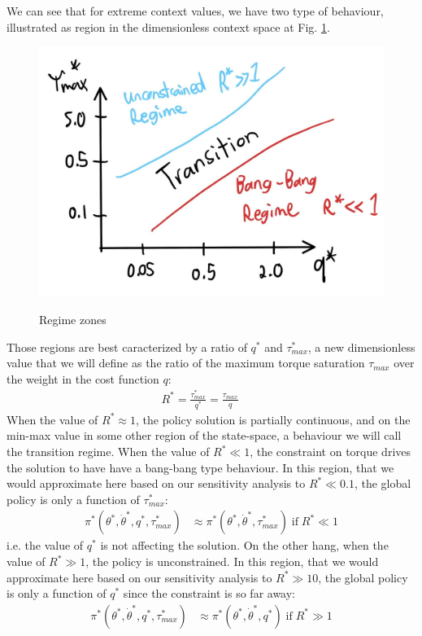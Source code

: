 We can see that for extreme context values, we have two type of behaviour, illustrated as region in the dimensionless context space at Fig. \ref{fig:regimeszones}. 
\begin{figure}[ht]
\begin{center}
\includegraphics[width=0.99\linewidth]{fig/regime_zones2.jpg}
\caption{Regime zones}
\vspace{-10pt}
\label{fig:regimeszones}
\end{center}
\end{figure}
Those regions are best caracterized by a ratio of $q^*$ and $\tau_{max}^*$, a new dimensionless value that we will define as the ratio of the maximum torque saturation $\tau_{max}$ over the weight in the cost function $q$:
\begin{align}
R^* = \frac{\tau^*_{max}}{q^*} = \frac{\tau_{max}}{q} \quad\quad 
\end{align}
When the value of $R^* \approx 1$, the policy solution is partially continuous, and on the min-max value in some other region of the state-space, a behaviour we will call the transition regime. When the value of $R^* \ll 1$, the constraint on torque drives the solution to have have a bang-bang type behaviour. In this region, that we would approximate here based on our sensitivity analysis to $R^* \ll 0.1$, the global policy is only a function of $\tau_{max}^*$:
\begin{align}
\pi^*( \theta^* , \dot{\theta}^*, q^*, \tau_{max}^*) &\approx 
\pi^*( \theta^* , \dot{\theta}^* , \tau_{max}^* ) \; \text{if} \; R^* \ll 1
\label{eq:bangbang_policy}
\end{align}
i.e. the value of $q^*$ is not affecting the solution. On the other hang, when the value of $R^* \gg 1$, the policy is unconstrained. In this region, that we would approximate here based on our sensitivity analysis to $R^* \gg 10$, the global policy is only a function of $q^*$ since the constraint is so far away:
\begin{align}
\pi^*( \theta^* , \dot{\theta}^*, q^*, \tau_{max}^*) &\approx 
\pi^*( \theta^* , \dot{\theta}^* , q^* ) \; \text{if} \;  R^* \gg 1 
\label{eq:unconstrained_policy}
\end{align}

